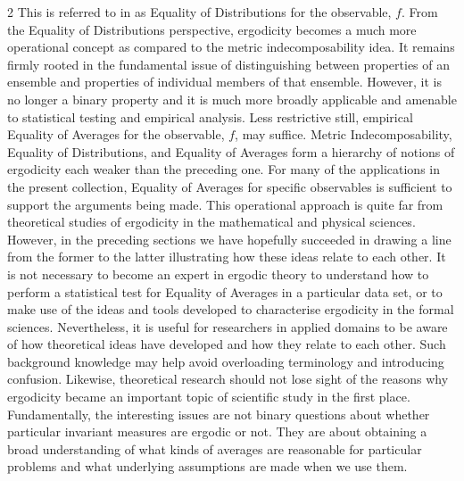 \documentclass[11pt]{article}
\begin{document}
\begin{multicols}{2}
This is referred to in \cite{UnderwoodPaillusson_SpectroscopicClassification} as Equality of Distributions for the observable, $f$. 
From the Equality of Distributions perspective, ergodicity becomes a much more operational concept as compared to the  metric indecomposability  idea.
It remains firmly rooted in the fundamental issue of distinguishing between properties of an ensemble and properties of individual members of that ensemble.
However, it is no longer a binary property and it is much more broadly applicable and amenable to statistical testing and empirical analysis.
Less restrictive still,  empirical Equality of Averages  for the observable, $f$, may suffice.
Metric Indecomposability, Equality of Distributions, and Equality of Averages form a hierarchy of notions of ergodicity each weaker than the preceding one.
For many of the applications in the present collection, Equality of Averages for specific observables is sufficient to support the arguments being made.
This operational approach is quite far from theoretical studies of ergodicity in the mathematical and physical sciences. 
However, in the preceding sections we have hopefully succeeded in drawing a line from the former to the latter illustrating how these ideas relate to each other.
It is not necessary to become an expert in ergodic theory to understand how to perform a statistical test for Equality of Averages in a particular data set, or to make use of the ideas and tools developed to characterise ergodicity in the formal sciences.
Nevertheless, it is useful for researchers in applied domains to be aware of how theoretical ideas have developed and how they relate to each other.
Such background knowledge may help avoid overloading terminology and introducing confusion.
Likewise, theoretical research should not lose sight of the reasons why ergodicity became an important topic of scientific study in the first place.
Fundamentally, the interesting issues are not binary questions about whether particular invariant measures are ergodic or not. They are about obtaining a broad understanding of what kinds of averages are reasonable for particular problems and what underlying assumptions are made when we use them.






\end{multicols}
\end{document}
